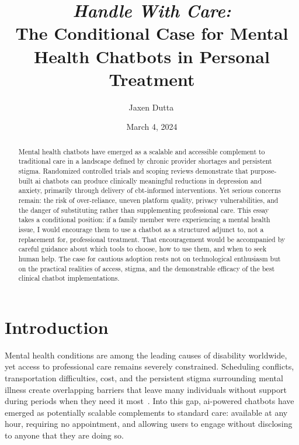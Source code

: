 \documentclass[11pt,showkeys]{essay}
\begin{document}
\title{\textit{Handle With Care:}\\
The Conditional Case for Mental Health Chatbots in Personal Treatment}

\author{Jaxen Dutta\, }

\date{March 4, 2024}

\begin{abstract}
Mental health chatbots have emerged as a scalable and accessible complement to traditional care in a landscape defined by chronic provider shortages and persistent stigma. Randomized controlled trials and scoping reviews demonstrate that purpose-built \gls{ai} chatbots can produce clinically meaningful reductions in depression and anxiety, primarily through delivery of \gls{cbt}-informed interventions. Yet serious concerns remain: the risk of over-reliance, uneven platform quality, privacy vulnerabilities, and the danger of substituting rather than supplementing professional care. This essay takes a conditional position: if a family member were experiencing a mental health issue, I would encourage them to use a chatbot as a structured adjunct to, not a replacement for, professional treatment. That encouragement would be accompanied by careful guidance about which tools to choose, how to use them, and when to seek human help. The case for cautious adoption rests not on technological enthusiasm but on the practical realities of access, stigma, and the demonstrable efficacy of the best clinical chatbot implementations.
\end{abstract}


\maketitle

\section{Introduction}

Mental health conditions are among the leading causes of disability worldwide, yet access to professional care remains severely constrained. Scheduling conflicts, transportation difficulties, cost, and the persistent stigma surrounding mental illness create overlapping barriers that leave many individuals without support during periods when they need it most~\cite{khawaja_your_2023}. Into this gap, \gls{ai}-powered chatbots have emerged as potentially scalable complements to standard care: available at any hour, requiring no appointment, and allowing users to engage without disclosing to anyone that they are doing so.
\end{document}
